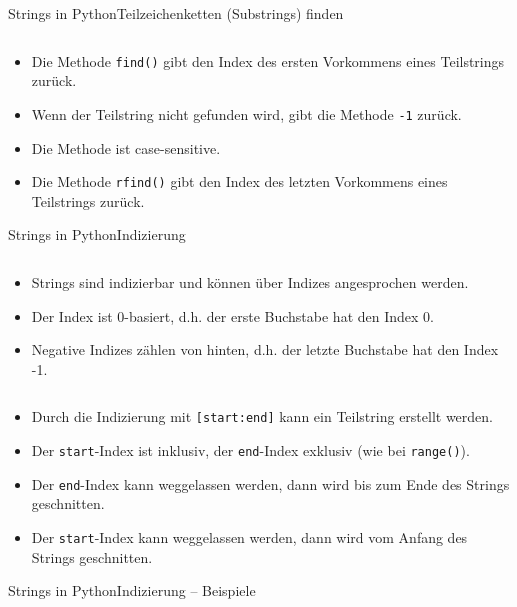 \documentclass[xelatex,aspectratio=169]{beamer}
\begin{document}
\begin{frame}{Strings in Python}{Teilzeichenketten (Substrings) finden}
    \inputminted{python}{src/strings_substring_find.py}
    \begin{itemize}
        \item Die Methode \texttt{find()} gibt den Index des ersten Vorkommens eines Teilstrings zurück.
        \item Wenn der Teilstring nicht gefunden wird, gibt die Methode \texttt{-1} zurück.
        \item Die Methode ist case-sensitive.
        \item Die Methode \texttt{rfind()} gibt den Index des letzten Vorkommens eines Teilstrings zurück.
    \end{itemize}
\end{frame}

\begin{frame}{Strings in Python}{Indizierung}
    \inputminted[lastline=3]{python}{src/strings_index.py}
    \begin{itemize}
        \item Strings sind indizierbar und können über Indizes angesprochen werden.
        \item Der Index ist 0-basiert, d.h. der erste Buchstabe hat den Index 0.
        \item Negative Indizes zählen von hinten, d.h. der letzte Buchstabe hat den Index -1.
    \end{itemize}
    \inputminted[firstline=5]{python}{src/strings_index.py}
    \begin{itemize}
        \item Durch die Indizierung mit \texttt{[start:end]} kann ein Teilstring erstellt werden.
        \item Der \texttt{start}-Index ist inklusiv, der \texttt{end}-Index exklusiv (wie bei \texttt{range()}).
        \item Der \texttt{end}-Index kann weggelassen werden, dann wird bis zum Ende des Strings geschnitten.
        \item Der \texttt{start}-Index kann weggelassen werden, dann wird vom Anfang des Strings geschnitten.
    \end{itemize}

\end{frame}

\begin{frame}{Strings in Python}{Indizierung -- Beispiele}
    \inputminted{python}{src/strings_index_examples.py}
\end{frame}
\end{document}
